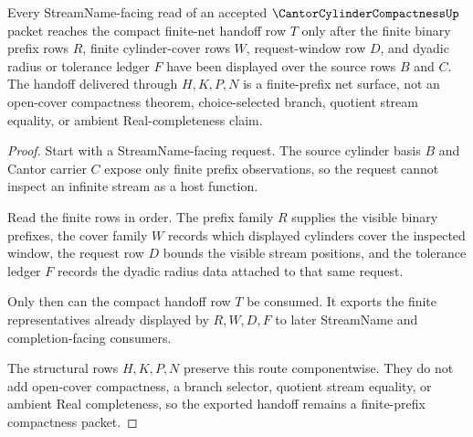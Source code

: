 \begin{theorem}
\label{thm:cantor-cylinder-compactness-prefix-net-handoff}
Every StreamName-facing read of an accepted $\CantorCylinderCompactnessUp$ packet reaches the compact finite-net handoff row $T$ only after the finite binary prefix rows $R$, finite cylinder-cover rows $W$, request-window row $D$, and dyadic radius or tolerance ledger $F$ have been displayed over the source rows $B$ and $C$. The handoff delivered through $H,K,P,N$ is a finite-prefix net surface, not an open-cover compactness theorem, choice-selected branch, quotient stream equality, or ambient Real-completeness claim.
\end{theorem}
\begin{proof}
Start with a StreamName-facing request. The source cylinder basis $B$ and Cantor carrier $C$ expose only finite prefix observations, so the request cannot inspect an infinite stream as a host function.

Read the finite rows in order. The prefix family $R$ supplies the visible binary prefixes, the cover family $W$ records which displayed cylinders cover the inspected window, the request row $D$ bounds the visible stream positions, and the tolerance ledger $F$ records the dyadic radius data attached to that same request.

Only then can the compact handoff row $T$ be consumed. It exports the finite representatives already displayed by $R,W,D,F$ to later StreamName and completion-facing consumers.

The structural rows $H,K,P,N$ preserve this route componentwise. They do not add open-cover compactness, a branch selector, quotient stream equality, or ambient Real completeness, so the exported handoff remains a finite-prefix compactness packet.
\end{proof}


